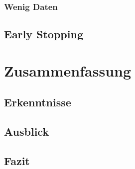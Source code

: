 \documentclass[ngerman]{report}
\begin{document}
    \subsection{Wenig Daten}
    
    \section{Early Stopping}
    
    
    \chapter{Zusammenfassung}  %
    \section{Erkenntnisse}
    
    \section{Ausblick}
    
    \section{Fazit}
    

    \listoffigures
    \listoftables
    \printbibliography
\end{document}
